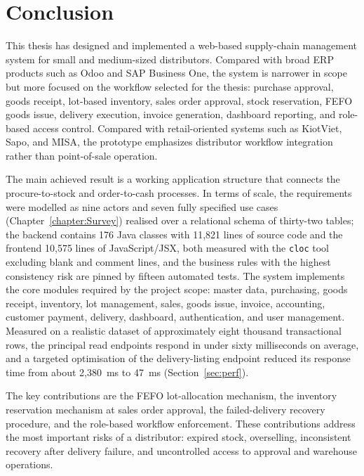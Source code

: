 \section{Conclusion}
This thesis has designed and implemented a web-based supply-chain management
system for small and medium-sized distributors. Compared with broad ERP products
such as Odoo and SAP Business One, the system is narrower in scope but more
focused on the workflow selected for the thesis: purchase approval, goods
receipt, lot-based inventory, sales order approval, stock reservation, FEFO
goods issue, delivery execution, invoice generation, dashboard reporting, and
role-based access control. Compared with retail-oriented systems such as
KiotViet, Sapo, and MISA, the prototype emphasizes distributor workflow
integration rather than point-of-sale operation.

The main achieved result is a working application structure that connects the
procure-to-stock and order-to-cash processes. In terms of scale, the
requirements were modelled as nine actors and seven fully specified use cases
(Chapter~\ref{chapter:Survey}) realised over a relational schema of thirty-two
tables; the backend contains 176 Java classes with 11,821 lines of source code
and the frontend 10,575 lines of JavaScript/JSX, both measured with the
\texttt{cloc} tool excluding blank and comment lines, and the business rules
with the highest consistency risk are pinned by fifteen automated tests. The
system implements the core modules required by the project scope: master data,
purchasing, goods receipt, inventory, lot management, sales, goods issue,
invoice, accounting, customer payment, delivery, dashboard, authentication, and
user management. Measured on a realistic dataset of approximately eight thousand
transactional rows, the principal read endpoints respond in under sixty
milliseconds on average, and a targeted optimisation of the delivery-listing
endpoint reduced its response time from about 2{,}380~ms to 47~ms
(Section~\ref{sec:perf}).

The key contributions are the FEFO lot-allocation mechanism, the inventory
reservation mechanism at sales order approval, the failed-delivery recovery
procedure, and the role-based workflow enforcement. These contributions address
the most important risks of a distributor: expired stock, overselling,
inconsistent recovery after delivery failure, and uncontrolled access to
approval and warehouse operations.

